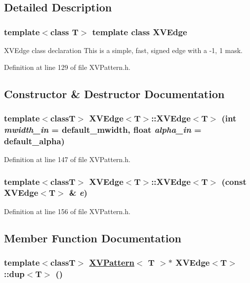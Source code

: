 \subsection{Detailed Description}
\subsubsection*{template$<$class T$>$  template class XVEdge}

XVEdge class declaration This is a simple, fast, signed edge with a -1, 1 mask.





Definition at line 129 of file XVPattern.h.

\subsection{Constructor \& Destructor Documentation}
\label{XVEdge_a0}
\hypertarget{class_XVEdge_a0}{
\subsubsection[XVEdge]{\setlength{\rightskip}{0pt plus 5cm}template$<$classT$>$ XVEdge$<$T$>$::XVEdge$<$T$>$ (int {\em mwidth\_\-in} = default\_\-mwidth, float {\em alpha\_\-in} = default\_\-alpha)}}




Definition at line 147 of file XVPattern.h.\label{XVEdge_a1}
\hypertarget{class_XVEdge_a1}{
\subsubsection[XVEdge]{\setlength{\rightskip}{0pt plus 5cm}template$<$classT$>$ XVEdge$<$T$>$::XVEdge$<$T$>$ (const XVEdge$<$T$>$ \& {\em e})}}




Definition at line 156 of file XVPattern.h.

\subsection{Member Function Documentation}
\label{XVEdge_a2}
\hypertarget{class_XVEdge_a2}{
\subsubsection[dup]{\setlength{\rightskip}{0pt plus 5cm}template$<$classT$>$ \hyperlink{class_XVPattern}{XVPattern}$<$ T $>$$\ast$ XVEdge$<$T$>$::dup$<$T$>$ ()}}




